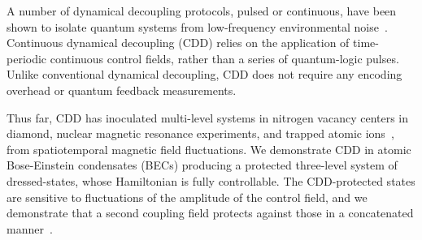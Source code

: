  A number of dynamical decoupling protocols, pulsed or continuous, have been shown to isolate quantum systems from low-frequency environmental noise~\cite{cohen_continuous_2017,fanchini_continuously_2007,aharon_fully_2016,biercuk_optimized_2009,cai_robust_2012,bermudez_robust_2012,baumgart_ultrasensitive_2016,kazakov_magic_2015,sarkany_controlling_2014}.
Continuous dynamical decoupling (CDD) relies on the application of time-periodic continuous control fields, rather than a series of quantum-logic pulses.
Unlike conventional dynamical decoupling, CDD does not require any encoding overhead or quantum feedback measurements.

Thus far, CDD has inoculated multi-level systems in nitrogen vacancy centers in diamond, nuclear magnetic resonance experiments, and trapped atomic ions~\cite{laucht_dressed_2017,farfurnik_experimental_2017,noguchi_generation_2012,golter_protecting_2014,timoney_quantum_2011,webster_simple_2013,barfuss_strong_2015,rohr_synchronizing_2014}, from spatiotemporal magnetic field fluctuations.
We demonstrate CDD in atomic Bose-Einstein condensates (BECs) producing a protected three-level system of dressed-states, whose Hamiltonian is fully controllable.
The CDD-protected states are sensitive to fluctuations of the amplitude of the control field, and we  demonstrate that a second coupling field protects against those in a concatenated manner~\cite{cohen_continuous_2017,farfurnik_experimental_2017,cai_robust_2012}.

